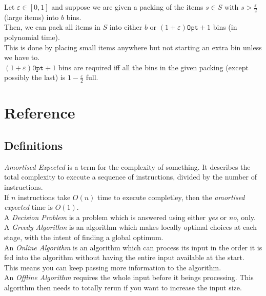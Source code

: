 \documentclass[11pt,a4paper]{article}
\begin{document}
Let $\varepsilon\in[0,1]$ and suppose we are given a packing of the items $s\in S$ with $s>\frac\varepsilon2$ (large items) into $b$ bins.\\
Then, we can pack all items in $S$ into either $b$ or $(1+\varepsilon)\mathtt{Opt}+1$ bins (in polynomial time).\\
This is done by placing small items anywhere but not starting an extra bin unless we have to.\\
$(1+\varepsilon)\mathtt{Opt}+1$ bins are required iff all the bins in the given packing (except possibly the last) is $1-\frac\varepsilon2$ full.

\newpage
\setcounter{section}{-1}
\section{Reference}

\subsection{Definitions}

\textit{Amortised Expected} is a term for the complexity of something. It describes the total complexity to execute a sequence of instructions, divided by the number of instructions.\\
\eg If $n$ instructions take $O(n)$ time to execute completley, then the \textit{amortised expected} time is $O(1)$.\\

A \textit{Decision Problem} is a problem which is answered using either \textit{yes} or \textit{no}, only.\\

A \textit{Greedy Algorithm} is an algorithm which makes locally optimal choices at each stage, with the intent of finding a global optimum.\\

An \textit{Online Algorithm} is an algorithm which can process its input in the order it is fed into the algorithm without having the entire input available at the start.\\
This means you can keep passing more information to the algorithm.\\

An \textit{Offline Algorithm} requires the whole input before it beings processing. This algorithm then needs to totally rerun if you want to increase the input size.
\end{document}

